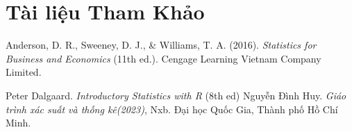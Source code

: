 \section{Tài liệu Tham Khảo}
\begin{thebibliography}{99}
Anderson, D. R., Sweeney, D. J., \& Williams, T. A. (2016). 
\textit{Statistics for Business and Economics} (11th ed.). Cengage Learning Vietnam Company Limited.

Peter Dalgaard.
\textit{Introductory Statistics with R} (8th ed)
Nguyễn Đình Huy.
\textit{Giáo trình xác suất và thống kê(2023)}, Nxb. Đại học Quốc Gia, Thành phố Hồ Chí Minh.

\end{thebibliography}
